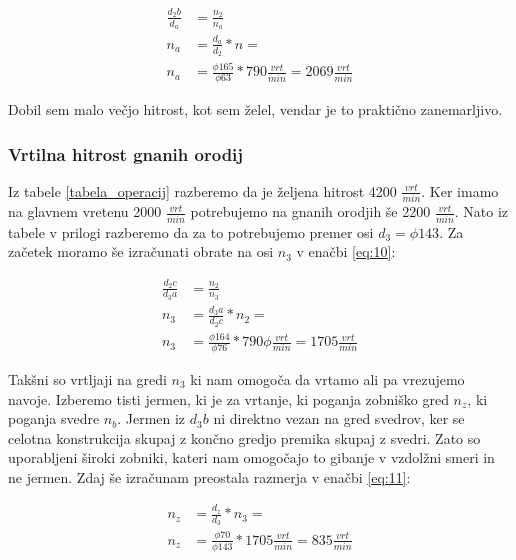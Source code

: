 \begin{equation}
	\label{eq:9}
	\begin{split}
		\frac{d_2b}{d_a} &= \frac{n_2}{n_a} \\
		n_a &= \frac{d_a}{d_2} * n = \\
		n_a &= \frac{\phi 165}{\phi 63} * 790 \frac{vrt}{min} = 2069 \frac{vrt}{min}
	\end{split}
\end{equation}

Dobil sem malo večjo hitrost, kot sem želel, vendar je to praktično zanemarljivo.

\subsubsection{Vrtilna hitrost gnanih orodij}
Iz tabele \ref{tabela_operacij} razberemo da je željena hitrost 4200 \(\frac{vrt}{min}\).
Ker imamo na glavnem vretenu 2000 \(\frac{vrt}{min}\) potrebujemo na gnanih orodjih
še 2200 \(\frac{vrt}{min}\). Nato iz tabele  v prilogi
razberemo da za to potrebujemo premer osi \(d_3 = \phi 143\). Za začetek moramo
še izračunati obrate na osi \(n_3\) v enačbi \ref{eq:10}:

\begin{equation}
	\label{eq:10}
	\begin{split}
		\frac{d_2c}{d_3a} &= \frac{n_2}{n_3} \\
		n_3 &= \frac{d_3a}{d_2c} * n_2 = \\
		n_3 &= \frac{\phi 164}{\phi 76} * 790 \phi \frac{vrt}{min} = 1705 \frac{vrt}{min}
	\end{split}
\end{equation}

Takšni so vrtljaji na gredi \(n_3\) ki nam omogoča da vrtamo ali pa vrezujemo navoje.
Izberemo tisti jermen, ki je za vrtanje, ki poganja zobniško gred \(n_z\), ki
poganja svedre \(n_b\). Jermen iz \(d_3b\) ni direktno vezan na gred svedrov,
ker se celotna konstrukcija skupaj z končno gredjo premika skupaj z
svedri. Zato so uporabljeni široki zobniki, kateri nam omogočajo to gibanje
v vzdolžni smeri in ne jermen. Zdaj še izračunam preostala razmerja
v enačbi \ref{eq:11}:

\begin{equation}
	\label{eq:11}
	\begin{split}
		n_z &= \frac{d_z}{d_3} * n_3 = \\
		n_z &= \frac{\phi 70}{\phi 143} * 1705 \frac{vrt}{min} = 835 \frac{vrt}{min}
	\end{split}
\end{equation}

